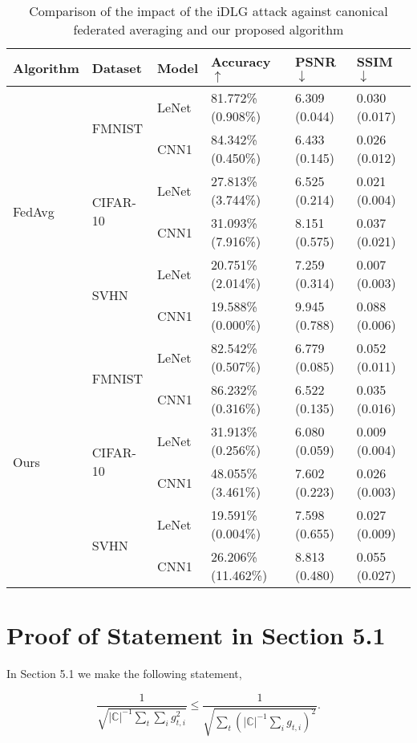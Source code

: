 \documentclass[conference,compsoc]{IEEEtran}
\begin{document}
\begin{table*}[ht]
\centering
\caption{Comparison of the impact of the iDLG attack against canonical federated averaging and our proposed algorithm}
\label{table:idlg}
\begin{tabular}{llllll}
\hline
\textbf{Algorithm} & \textbf{Dataset} & \textbf{Model} & \textbf{Accuracy} $\uparrow$ & \textbf{PSNR} $\downarrow$ & \textbf{SSIM} $\downarrow$ \\
\hline
\multirow{6}{*}{FedAvg} & \multirow{2}{*}{FMNIST} & LeNet & 81.772\% (0.908\%) & 6.309 (0.044) & 0.030 (0.017) \\
& & CNN1 & 84.342\% (0.450\%) & 6.433 (0.145) & 0.026 (0.012) \\
\cline{2-6}
& \multirow{2}{*}{CIFAR-10} & LeNet & 27.813\% (3.744\%) & 6.525 (0.214) & 0.021 (0.004) \\
& & CNN1 & 31.093\% (7.916\%) & 8.151 (0.575) & 0.037 (0.021) \\
\cline{2-6}
& \multirow{2}{*}{SVHN} & LeNet & 20.751\% (2.014\%) & 7.259 (0.314) & 0.007 (0.003) \\
& & CNN1 & 19.588\% (0.000\%) & 9.945 (0.788) & 0.088 (0.006) \\
\hline
\multirow{6}{*}{Ours} & \multirow{2}{*}{FMNIST} & LeNet & 82.542\% (0.507\%) & 6.779 (0.085) & 0.052 (0.011) \\
& & CNN1 & 86.232\% (0.316\%) & 6.522 (0.135) & 0.035 (0.016) \\
\cline{2-6}
& \multirow{2}{*}{CIFAR-10} & LeNet & 31.913\% (0.256\%) & 6.080 (0.059) & 0.009 (0.004) \\
& & CNN1 & 48.055\% (3.461\%) & 7.602 (0.223) & 0.026 (0.003) \\
\cline{2-6}
& \multirow{2}{*}{SVHN} & LeNet & 19.591\% (0.004\%) & 7.598 (0.655) & 0.027 (0.009) \\
& & CNN1 & 26.206\% (11.462\%) & 8.813 (0.480) & 0.055 (0.027) \\
\hline
\end{tabular}
\end{table*}


\section{Proof of Statement in Section 5.1}

In Section 5.1 we make the following statement,

\begin{equation*}
    \frac{1}{\sqrt{|\mathbb{C}|^{-1} \sum_t \sum_i g_{t, i}^2}} \leq \frac{1}{\sqrt{\sum_t (|\mathbb{C}|^{-1} \sum_i g_{t, i})^2}}.
\end{equation*}
\end{document}
